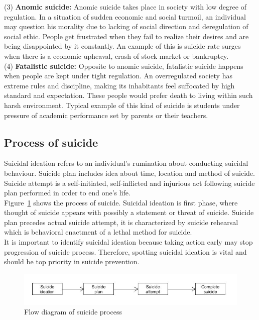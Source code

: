 (3) \textbf{Anomic suicide:} Anomic suicide takes place in society with low degree of regulation. In a situation of sudden economic and social turmoil, an individual may question his morality due to lacking of social direction and deregulation of social ethic. People get frustrated when they fail to realize their desires and are being disappointed by it constantly. An example of this is suicide rate surges when there is a economic upheaval, crash of stock market or bankruptcy.\\
(4) \textbf{Fatalistic suicide:} Opposite to anomic suicide, fatalistic suicide happens when people are kept under tight regulation. An overregulated society has extreme rules and discipline, making its inhabitants feel suffocated by high standard and expectation. These people would prefer death to living within such harsh environment. Typical example of this kind of suicide is students under pressure of academic performance set by parents or their teachers.\\

\subsection*{Process of suicide}
Suicidal ideation refers to an individual's rumination about conducting suicidal behaviour. Suicide plan includes idea about time, location and method of suicide. Suicide attempt is a self-initiated, self-inflicted and injurious act following suicide plan performed in order to end one's life.\\
Figure~\ref{fig:suicide_process} shows the process of suicide. Suicidal ideation is first phase, where thought of suicide appears with possibly a statement or threat of suicide. Suicide plan precedes actual suicide attempt, it is characterized by suicide rehearsal which is behavioral enactment of a lethal method for suicide.\\
It is important to identify suicidal ideation because taking action early may stop progression of suicide process. Therefore, spotting suicidal ideation is vital and should be top priority in suicide prevention.
 
\begin{figure}[!ht]
\centering
\includegraphics[width=\textwidth, clip=true]{img/suicide_process}
\caption[Process of suicide]{Flow diagram of suicide process} 
\label{fig:suicide_process}
\end{figure}


